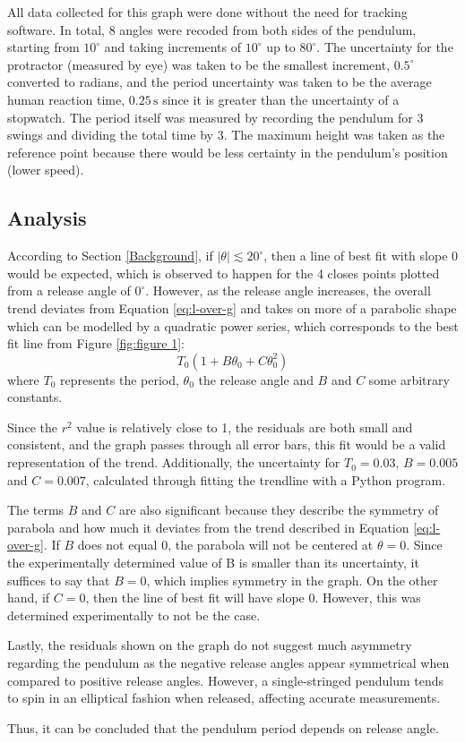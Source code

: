\documentclass[12pt]{article}
\begin{document}
All data collected for this graph were done without the need for tracking software. {\color{blue}In total, 8 angles were recoded from both sides of the pendulum, starting from $10^\circ$ and taking increments of $10^\circ$ up to $80^\circ$}. The uncertainty for the protractor (measured by eye) was taken to be the smallest increment, $0.5^{\circ}$ converted to radians, and the period uncertainty was taken to be the average human reaction time, $0.25\,\text{s}$ \cite{reaction-time} {\color{blue} since it is greater than the uncertainty of a stopwatch. The period itself was measured by recording the pendulum for 3 swings and dividing the total time by 3. The maximum height was taken as the reference point because there would be less certainty in the pendulum's position (lower speed).}

\subsection{Analysis}
According to Section \ref{Background}, {\color{blue} if $|\theta| \lesssim 20^{\circ}$, then a line of best fit with slope 0 would be expected, which is observed to happen for the 4 closes points plotted from a release angle of $0^\circ$. However, as the release angle increases, the overall trend deviates from Equation \ref{eq:l-over-g} and takes on more of a parabolic shape which can be modelled by a quadratic power series, which corresponds to the best fit line from Figure \ref{fig:figure 1}:}
\begin{equation} \label{eq:power series}
    T_0(1 + B\theta_0 + C\theta_0^2)
\end{equation}
where $T_0$ represents the period, $\theta_0$ the release angle and $B$ and $C$ some arbitrary constants. {\color{blue}Since the $r^2$ value is relatively close to 1, the residuals are both small and consistent, and the graph passes through all error bars, this fit would be a valid representation of the trend. Additionally, the uncertainty for $T_0 = 0.03$, $B = 0.005$ and $C = 0.007$, calculated through fitting the trendline with a Python program.

The terms $B$ and $C$ are also significant because they describe the symmetry of parabola and how much it deviates from the trend described in Equation \ref{eq:l-over-g}. If $B$ does not equal 0, the parabola will not be centered at $\theta = 0$. Since the experimentally determined value of B is smaller than its uncertainty, it suffices to say that $B = 0$, which implies symmetry in the graph. On the other hand, if $C = 0$, then the line of best fit will have slope 0. However, this was determined experimentally to not be the case.


Lastly, the residuals shown on the graph do not suggest much asymmetry regarding the pendulum as the negative release angles appear symmetrical when compared to positive release angles. However, a single-stringed pendulum tends to spin in an elliptical fashion when released, affecting accurate measurements.

Thus, it can be concluded that the pendulum period depends on release angle.}
\end{document}

